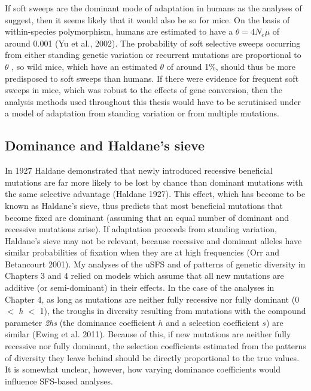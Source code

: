 	If soft sweeps are the dominant mode of adaptation in humans as the analyses of \cite{RN338} suggest, then it seems likely that it would also be so for mice. On the basis of within-species polymorphism, humans are estimated to have a $\theta = 4N_e\mu$ of around 0.001 (Yu et al., 2002). The probability of soft selective sweeps occurring from either standing genetic variation or recurrent mutations are proportional to $\theta$ \citep{RN336}, so wild mice, which have an estimated $\theta$ of around 1\%, should thus be more predisposed to soft sweeps than humans. If there were evidence for frequent soft sweeps in mice, which was robust to the effects of gene conversion, then the analysis methods used throughout this thesis would have to be scrutinised under a model of adaptation from standing variation or from multiple mutations.
 
  \subsection{Dominance and Haldane's sieve}
 
	In 1927 Haldane demonstrated that newly introduced recessive beneficial mutations are far more likely to be lost by chance than dominant mutations with the same selective advantage (Haldane 1927). This effect, which has become to be known as Haldane's sieve, thus predicts that most beneficial mutations that become fixed are dominant (assuming that an equal number of dominant and recessive mutations arise). If adaptation proceeds from standing variation, Haldane's sieve may not be relevant, because recessive and dominant alleles have similar probabilities of fixation when they are at high frequencies (Orr and Betancourt 2001). My analyses of the uSFS and of patterns of genetic diversity in Chapters 3 and 4 relied on models which assume that all new mutations are additive (or semi-dominant) in their effects. In the case of the analyses in Chapter 4, as long as mutations are neither fully recessive nor fully dominant (0 $<$ \textit{h} $<$ 1), the troughs in diversity resulting from mutations with the compound parameter \textit{2hs} (the dominance coefficient $h$ and a selection coefficient $s$) are similar (Ewing et al. 2011). Because of this, if new mutations are neither fully recessive nor fully dominant, the selection coefficients estimated from the patterns of diversity they leave behind should be directly proportional to the true values. It is somewhat unclear, however, how varying dominance coefficients would influence SFS-based analyses.
	
